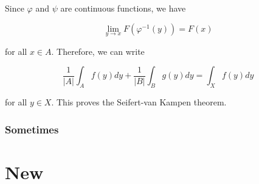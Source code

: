 \documentclass{sazuko}
\begin{document}
Since $\varphi$ and $\psi$ are continuous functions, we have

$$\lim_{y \to x} F(\varphi^{-1}(y)) = F(x)$$

for all $x \in A$. Therefore, we can write

$$\frac{1}{|A|} \int_A f(y) dy + \frac{1}{|B|} \int_B g(y) dy = \int_X
f(y) dy$$

for all $y \in X$.
This proves the Seifert-van Kampen theorem.

\subsubsection{Sometimes}

\togglelayout

\lipsum[1]

\lipsum[1]
\lipsum[1]
\lipsum[1]
\lipsum[1]
\lipsum[1]

\section{New}






\end{document}

